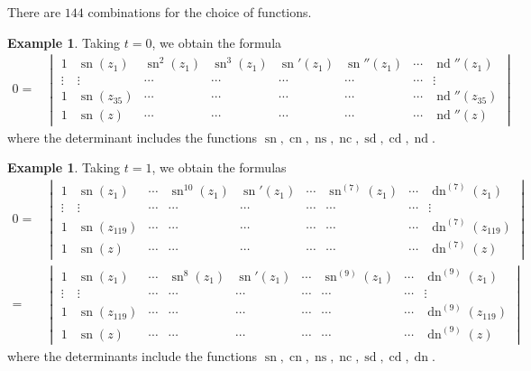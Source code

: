 \documentclass{amsart}
\theoremstyle{definition}
\newtheorem{example}[theorem]{Example}
\DeclareMathOperator{\ns}{ns}
\DeclareMathOperator{\nc}{nc}
\DeclareMathOperator{\dn}{dn}
\DeclareMathOperator{\sn}{sn}
\DeclareMathOperator{\cn}{cn}
\DeclareMathOperator{\nd}{nd}
\DeclareMathOperator{\cd}{cd}
\DeclareMathOperator{\sd}{sd}
\begin{document}
There are $144$ combinations for the choice of functions.
\begin{example}
    Taking $t=0$, we obtain the formula
    \begin{align*}
        0=&\begin{vmatrix}
1&\sn(z_1) & \sn^2(z_1) & \sn^{3}(z_1) & \sn'(z_1) & \sn''(z_1) & \cdots &   \nd''(z_1) \\
 \vdots&\vdots & \cdots & \cdots &  \cdots &  \cdots & \cdots & \vdots \\
 1& \sn(z_{35})&\cdots  &  \cdots & \cdots & \cdots & \cdots   & \nd''(z_{35})\\
1& \sn(z)&\cdots &\cdots &\cdots  &\cdots &\cdots & \nd''(z)
\end{vmatrix}
    \end{align*}
    where the determinant includes the functions $\sn,\cn,\ns,\nc,\sd,\cd,\nd$.
\end{example}

\begin{example}
    Taking $t=1$, we obtain the formulas
    \begin{align*}
        0=&\begin{vmatrix}
1&\sn(z_1) & \cdots & \sn^{10}(z_1) &\sn'(z_1) & \cdots & \sn^{(7)}(z_1) & \cdots &   \dn^{(7)}(z_1) \\
 \vdots&\vdots & \cdots & \cdots &  \cdots & \cdots & \cdots & \cdots & \vdots \\
 1& \sn(z_{119})&\cdots  & \cdots & \cdots & \cdots & \cdots & \cdots   & \dn^{(7)}(z_{119})\\
1& \sn(z)&\cdots &\cdots &\cdots &\cdots &\cdots &\cdots & \dn^{(7)}(z)
\end{vmatrix}\\
=&\begin{vmatrix}
1&\sn(z_1) & \cdots & \sn^{8}(z_1) &\sn'(z_1) & \cdots & \sn^{(9)}(z_1) & \cdots &   \dn^{(9)}(z_1) \\
 \vdots&\vdots & \cdots & \cdots &  \cdots & \cdots & \cdots & \cdots & \vdots \\
 1& \sn(z_{119})&\cdots  & \cdots & \cdots & \cdots & \cdots & \cdots   & \dn^{(9)}(z_{119})\\
1& \sn(z)&\cdots &\cdots &\cdots &\cdots &\cdots &\cdots & \dn^{(9)}(z)
\end{vmatrix}
    \end{align*}
    where the determinants include the functions $\sn,\cn,\ns,\nc,\sd,\cd,\dn$.    
\end{example}
\end{document}
